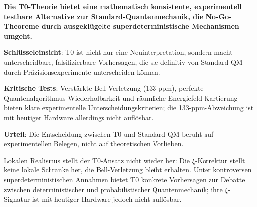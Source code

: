 			\begin{tcolorbox}[colback=green!5!white,colframe=green!75!black,title=Abschließende Bewertung]
				\textbf{Die T0-Theorie bietet eine mathematisch konsistente, experimentell testbare Alternative zur Standard-Quantenmechanik, die No-Go-Theoreme durch ausgeklügelte superdeterministische Mechanismen umgeht.} 
				
				\textbf{Schlüsseleinsicht}: T0 ist nicht nur eine Neuinterpretation, sondern macht unterscheidbare, falsifizierbare Vorhersagen, die sie definitiv von Standard-QM durch Präzisionsexperimente unterscheiden können.
				
				\textbf{Kritische Tests}: Verstärkte Bell-Verletzung (133 ppm), perfekte Quantenalgorithmus-Wiederholbarkeit und räumliche Energiefeld-Kartierung bieten klare experimentelle Unterscheidungskriterien; die 133-ppm-Abweichung ist mit heutiger Hardware allerdings nicht auflösbar.
				
				\textbf{Urteil}: Die Entscheidung zwischen T0 und Standard-QM beruht auf experimentellen Belegen, nicht auf theoretischen Vorlieben.
			\end{tcolorbox}
			
			Lokalen Realismus stellt der T0-Ansatz nicht wieder her: Die $\xi$-Korrektur stellt keine lokale Schranke her, die Bell-Verletzung bleibt erhalten. Unter kontroversen superdeterministischen Annahmen bietet T0 konkrete Vorhersagen zur Debatte zwischen deterministischer und probabilistischer Quantenmechanik; ihre $\xi$-Signatur ist mit heutiger Hardware jedoch nicht auflösbar.
			
